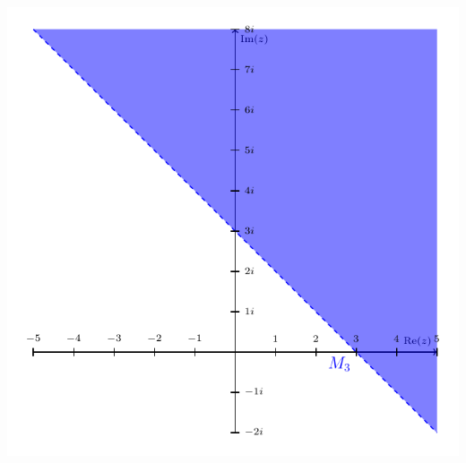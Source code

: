 \documentclass[a4paper,graphics,11pt]{article}
\begin{document}
\strut\qquad\qquad\qquad\qquad\quad\includegraphics[scale=0.86]{graphics/graph3.pdf}
\end{document}

